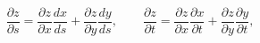 \begin{equation}
\frac{\partial z}{\partial s} =
\frac{\partial z}{\partial x} \frac{dx}{ds} +
\frac{\partial z}{\partial y} \frac{dy}{ds} ,  \qquad
\frac{\partial z}{\partial t} =
\frac{\partial z}{\partial x} \frac{\partial x}{\partial t} +
\frac{\partial z}{\partial y} \frac{\partial y}{\partial t} ,  \qquad
\end{equation}

\medskip \medskip \medskip 




